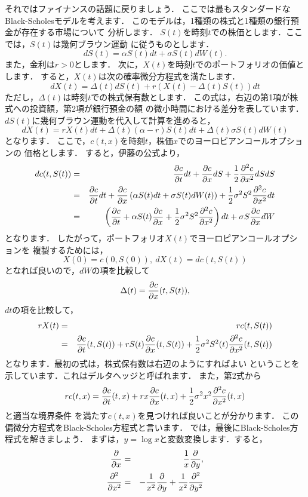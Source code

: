 それではファイナンスの話題に戻りましょう．
ここでは最もスタンダードなBlack-Scholesモデルを考えます．
このモデルは，1種類の株式と1種類の銀行預金が存在する市場について
分析します．
$S(t)$を時刻$t$での株価とします．ここでは，$S(t)$は幾何ブラウン運動
に従うものとします．
\[
 dS(t)=\alpha S(t)dt+\sigma S(t)dW(t).
\]
また，金利は$r>0$とします．
次に，$X(t)$を時刻$t$でのポートフォリオの価値とします．
すると，$X(t)$は次の確率微分方程式を満たします．
\[
 dX(t)=\Delta(t)dS(t)+r(X(t)-\Delta(t)S(t))dt
\]
ただし，$\Delta(t)$は時刻$t$での株式保有数とします．
この式は，右辺の第1項が株式への投資額，第2項が銀行預金の額
の微小時間における差分を表しています．
$dS(t)$に幾何ブラウン運動を代入して計算を進めると，
\[
 dX(t)=rX(t)dt+\Delta(t)(\alpha-r)S(t)dt+\Delta(t)\sigma S(t)dW(t)
\]
となります．
ここで，$c(t,x)$を時刻$t$，株価$x$でのヨーロピアンコールオプションの
価格とします．
すると，伊藤の公式より，
\begin{eqnarray*}
 dc(t,S(t))& = &\frac{\partial c}{\partial t}dt+\frac{\partial c}{\partial x}dS+
  \frac{1}{2}\frac{\partial^2c}{\partial x^2}dSdS\\
 & = &\frac{\partial c}{\partial t}dt+
  \frac{\partial c}{\partial x}\left(\alpha S(t)dt+\sigma S(t)dW(t)\right)+
  \frac{1}{2}\sigma^2S^2\frac{\partial^2c}{\partial x^2}dt\\
 & = &\left(\frac{\partial c}{\partial t}+\alpha S(t)\frac{\partial c}{\partial x}+
  \frac{1}{2}\sigma^2S^2\frac{\partial^2c}{\partial x^2}\right)dt+
  \sigma S\frac{\partial c}{\partial x}dW
\end{eqnarray*}
となります．
したがって，ポートフォリオ$X(t)$でヨーロピアンコールオプションを
複製するためには，
\[
 X(0)=c(0,S(0)),\ dX(t)=dc(t,S(t))
\]
となれば良いので，$dW$の項を比較して
\[
 \Delta(t)=\frac{\partial c}{\partial x}(t,S(t)),
\]
$dt$の項を比較して，
\begin{eqnarray*}
 rX(t)& = &rc(t,S(t)) \\
 & = &\frac{\partial c}{\partial t}(t,S(t))+rS(t)\frac{\partial c}{\partial x}(t,S(t))+
  \frac{1}{2}\sigma^2S^2(t)\frac{\partial^2c}{\partial x^2}(t,S(t))
\end{eqnarray*}
となります．最初の式は，株式保有数は右辺のようにすればよい
ということを示しています．これはデルタヘッジと呼ばれます．
また，第2式から
\[
 rc(t,x)=\frac{\partial c}{\partial t}(t,x)+rx\frac{\partial c}{\partial x}(t,x)+
  \frac{1}{2}\sigma^2x^2\frac{\partial^2c}{\partial x^2}(t,x)
\]
と適当な境界条件
を満たす$c(t,x)$を見つければ良いことが分かります．
この偏微分方程式をBlack-Scholes方程式と言います．
では，最後にBlack-Scholes方程式を解きましょう．
まずは，$y=\log x$と変数変換します．すると，
\begin{eqnarray*}
 \frac{\partial}{\partial x}& = &\frac{1}{x}\frac{\partial}{\partial y},\\
 \frac{\partial^2}{\partial x^2}& = &-\frac{1}{x^2}\frac{\partial}{\partial y}+\frac{1}{x^2}
  \frac{\partial^2}{\partial y^2}
\end{eqnarray*}
